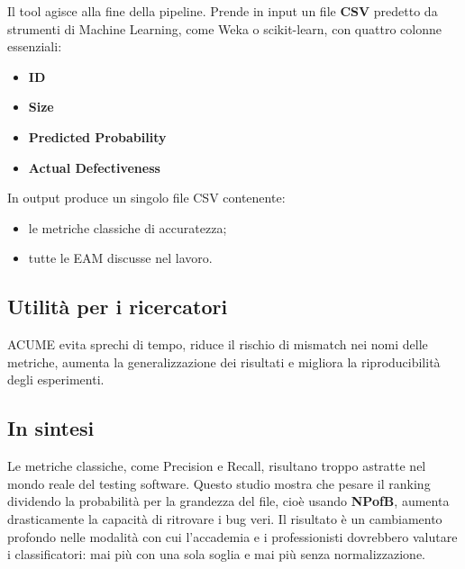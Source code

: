 Il tool agisce alla fine della pipeline. Prende in input un file \textbf{CSV} predetto da strumenti di Machine Learning, come Weka o scikit-learn, con quattro colonne essenziali:
\begin{itemize}
    \item \textbf{ID}
    \item \textbf{Size}
    \item \textbf{Predicted Probability}
    \item \textbf{Actual Defectiveness}
\end{itemize}

In output produce un singolo file CSV contenente:
\begin{itemize}
    \item le metriche classiche di accuratezza;
    \item tutte le EAM discusse nel lavoro.
\end{itemize}

\subsection{Utilità per i ricercatori}

ACUME evita sprechi di tempo, riduce il rischio di mismatch nei nomi delle metriche, aumenta la generalizzazione dei risultati e migliora la riproducibilità degli esperimenti.

\subsection*{In sintesi}

Le metriche classiche, come Precision e Recall, risultano troppo astratte nel mondo reale del testing software. Questo studio mostra che pesare il ranking dividendo la probabilità per la grandezza del file, cioè usando \textbf{NPofB}, aumenta drasticamente la capacità di ritrovare i bug veri. Il risultato è un cambiamento profondo nelle modalità con cui l'accademia e i professionisti dovrebbero valutare i classificatori: mai più con una sola soglia e mai più senza normalizzazione.